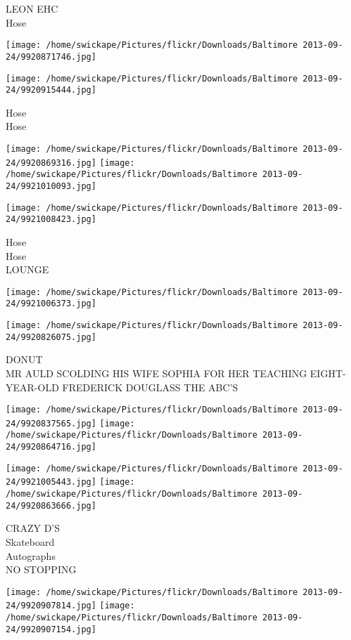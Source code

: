 \documentclass[10pt,letterpaper]{article}
\begin{document}
LEON EHC\\
Hose
\pagebreak

\texttt{[image: /home/swickape/Pictures/flickr/Downloads/Baltimore 2013-09-24/9920871746.jpg]}

\vspace{0.25in}
\texttt{[image: /home/swickape/Pictures/flickr/Downloads/Baltimore 2013-09-24/9920915444.jpg]}

Hose\\
Hose
\pagebreak

\texttt{[image: /home/swickape/Pictures/flickr/Downloads/Baltimore 2013-09-24/9920869316.jpg]}
\texttt{[image: /home/swickape/Pictures/flickr/Downloads/Baltimore 2013-09-24/9921010093.jpg]}

\vspace{0.25in}
\texttt{[image: /home/swickape/Pictures/flickr/Downloads/Baltimore 2013-09-24/9921008423.jpg]}

Hose\\
Hose\\
LOUNGE
\pagebreak

\texttt{[image: /home/swickape/Pictures/flickr/Downloads/Baltimore 2013-09-24/9921006373.jpg]}

\vspace{0.25in}
\texttt{[image: /home/swickape/Pictures/flickr/Downloads/Baltimore 2013-09-24/9920826075.jpg]}

DONUT\\
MR AULD SCOLDING HIS WIFE SOPHIA FOR HER TEACHING EIGHT{-}YEAR{-}OLD FREDERICK DOUGLASS THE ABC'S
\pagebreak

\texttt{[image: /home/swickape/Pictures/flickr/Downloads/Baltimore 2013-09-24/9920837565.jpg]}
\texttt{[image: /home/swickape/Pictures/flickr/Downloads/Baltimore 2013-09-24/9920864716.jpg]}

\texttt{[image: /home/swickape/Pictures/flickr/Downloads/Baltimore 2013-09-24/9921005443.jpg]}
\texttt{[image: /home/swickape/Pictures/flickr/Downloads/Baltimore 2013-09-24/9920863666.jpg]}

CRAZY D'S\\
Skateboard\\
Autographs\\
NO STOPPING
\pagebreak

\texttt{[image: /home/swickape/Pictures/flickr/Downloads/Baltimore 2013-09-24/9920907814.jpg]}
\texttt{[image: /home/swickape/Pictures/flickr/Downloads/Baltimore 2013-09-24/9920907154.jpg]}
\end{document}
